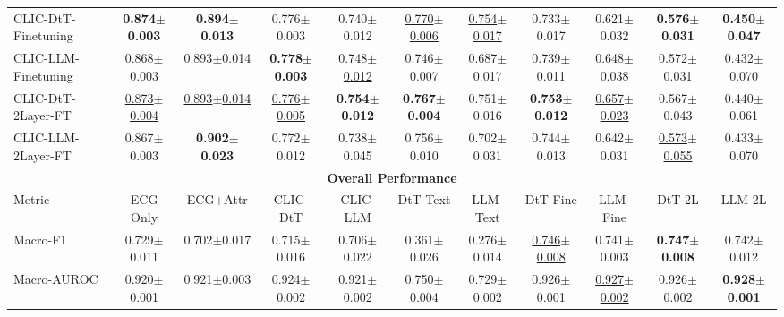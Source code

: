 \begin{table}[!h]
{\begin{tabular}{lcccccccccc}
CLIC-DtT-Finetuning &
\textbf{0.874$\pm$0.003} & \textbf{0.894$\pm$0.013} &
0.776$\pm$0.003 & 0.740$\pm$0.012 &
\underline{0.770$\pm$0.006} & \underline{0.754$\pm$0.017} &
0.733$\pm$0.017 & 0.621$\pm$0.032 &
\textbf{0.576$\pm$0.031} & \textbf{0.450$\pm$0.047} \\

CLIC-LLM-Finetuning &
0.868$\pm$0.003 & \underline{0.893$\pm$0.014} &
\textbf{0.778$\pm$0.003} & \underline{0.748$\pm$0.012} &
0.746$\pm$0.007 & 0.687$\pm$0.017 &
0.739$\pm$0.011 & 0.648$\pm$0.038 &
0.572$\pm$0.031 & 0.432$\pm$0.070 \\

CLIC-DtT-2Layer-FT &
\underline{0.873$\pm$0.004} & \underline{0.893$\pm$0.014} &
\underline{0.776$\pm$0.005} & \textbf{0.754$\pm$0.012} &
\textbf{0.767$\pm$0.004} & 0.751$\pm$0.016 &
\textbf{0.753$\pm$0.012} & \underline{0.657$\pm$0.023} &
0.567$\pm$0.043 & 0.440$\pm$0.061 \\

CLIC-LLM-2Layer-FT &
0.867$\pm$0.003 & \textbf{0.902$\pm$0.023} &
0.772$\pm$0.012 & 0.738$\pm$0.045 &
0.756$\pm$0.010 & 0.702$\pm$0.031 &
0.744$\pm$0.013 & 0.642$\pm$0.031 &
\underline{0.573$\pm$0.055} & 0.433$\pm$0.070 \\

\midrule
\multicolumn{11}{c}{\textbf{Overall Performance}} \\
\midrule

\multicolumn{1}{l}{Metric}
& \multicolumn{1}{c}{\scriptsize ECG Only}
& \multicolumn{1}{c}{\scriptsize ECG+Attr}
& \multicolumn{1}{c}{\scriptsize CLIC-DtT}
& \multicolumn{1}{c}{\scriptsize CLIC-LLM}
& \multicolumn{1}{c}{\scriptsize DtT-Text}
& \multicolumn{1}{c}{\scriptsize LLM-Text}
& \multicolumn{1}{c}{\scriptsize DtT-Fine}
& \multicolumn{1}{c}{\scriptsize LLM-Fine}
& \multicolumn{1}{c}{\scriptsize DtT-2L}
& \multicolumn{1}{c}{\scriptsize LLM-2L} \\
\cmidrule(lr){1-1} \cmidrule(lr){2-11}

Macro-F1 &
0.729$\pm$0.011 &
0.702$\pm$0.017 &
0.715$\pm$0.016 &
0.706$\pm$0.022 &
0.361$\pm$0.026 &
0.276$\pm$0.014 &
\underline{0.746$\pm$0.008} &
0.741$\pm$0.003 &
\textbf{0.747$\pm$0.008} &
0.742$\pm$0.012 \\

Macro-AUROC &
0.920$\pm$0.001 &
0.921$\pm$0.003 &
0.924$\pm$0.002 &
0.921$\pm$0.002 &
0.750$\pm$0.004 &
0.729$\pm$0.002 &
0.926$\pm$0.001 &
\underline{0.927$\pm$0.002} &
0.926$\pm$0.002 &
\textbf{0.928$\pm$0.001} \\

\bottomrule
\end{tabular}
}
\end{table}

